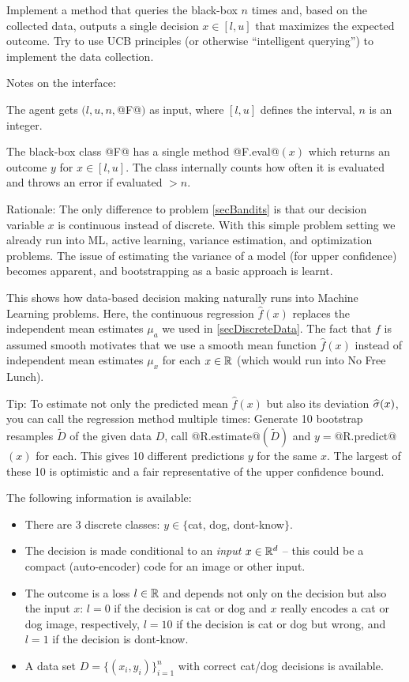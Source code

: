 Implement a method that queries the black-box $n$ times and, based on the collected data, outputs a single decision $x\in[l,u]$ that maximizes the expected outcome. Try to use UCB principles (or otherwise ``intelligent querying'') to implement the data collection.

Notes on the interface:
\begin{items}
\item The agent gets $(l,u,n,$@F@$)$ as input, where $[l,u]$ defines the interval, $n$ is an integer.
\item The black-box class @F@ has a single method @F.eval@$(x)$ which returns an outcome $y$ for $x\in[l,u]$. The class internally counts how often it is evaluated and throws an error if evaluated $>n$.
\end{items}

Rationale: The only difference to problem \ref{secBandits} is that our decision variable $x$ is continuous instead of discrete. With this simple problem setting we already run into ML, active learning, variance estimation, and optimization problems. The issue of estimating the variance of a model (for upper confidence) becomes apparent, and bootstrapping as a basic approach is learnt.

This shows how data-based decision making naturally runs into Machine Learning problems. Here, the continuous regression $\hat f(x)$ replaces the independent mean estimates $\mu_a$ we used in \ref{secDiscreteData}. The fact that $f$ is assumed smooth motivates that we use a smooth mean function $\hat f(x)$ instead of independent mean estimates $\mu_x$ for each $x\in{\mathbb{R}}$ (which would run into No Free Lunch).

Tip: To estimate not only the predicted mean $\hat f(x)$ but also its deviation $\widehat{\sigma}(x)$, you can call the regression method multiple times: Generate 10 bootstrap resamples $\tilde D$ of the given data $D$, call @R.estimate@$(\tilde D)$ and $y=$@R.predict@$(x)$ for each. This gives 10 different predictions $y$ for the same $x$. The largest of these 10 is optimistic and a fair representative of the upper confidence bound.


The following information is available:
\begin{itemize}
\item There are 3 discrete classes: $y\in\{$cat, dog, dont-know$\}$.
\item The decision is made conditional to an \emph{input} $x\in{\mathbb{R}}^d$ -- this could be a compact (auto-encoder) code for an image or other input.
\item The outcome is a loss $l\in{\mathbb{R}}$ and depends not only on the decision but also the input $x$: $l=0$ if the decision is cat or dog and $x$ really encodes a cat or dog image, respectively, $l=10$ if the decision is cat or dog but wrong, and $l=1$ if the decision is dont-know.
\item A data set $D=\{ (x_i, y_i) \}_{i=1}^n$ with correct cat/dog decisions is available.
\end{itemize}


